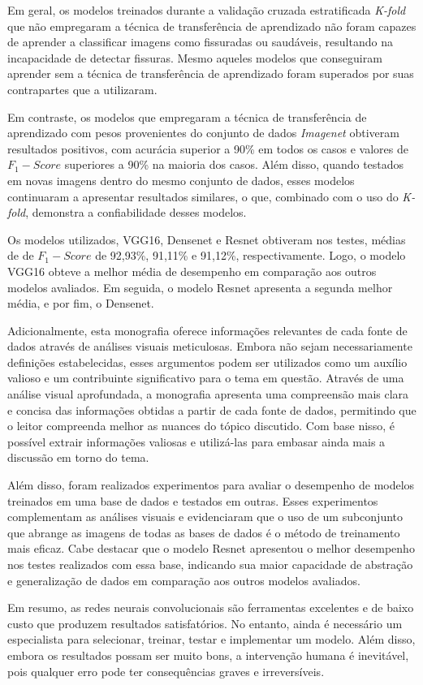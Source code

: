 
Em geral, os modelos treinados durante a validação cruzada estratificada \textit{K-fold} que não empregaram a técnica de transferência de aprendizado não foram capazes de aprender a classificar imagens como fissuradas ou saudáveis, resultando na incapacidade de detectar fissuras. 
Mesmo aqueles modelos que conseguiram aprender sem a técnica de transferência de aprendizado foram superados por suas contrapartes que a utilizaram.

Em contraste, os modelos que empregaram a técnica de transferência de aprendizado com pesos provenientes do conjunto de dados \textit{Imagenet} obtiveram resultados positivos, com acurácia superior a 90\% em todos os casos e valores de $F_{1}-Score$ superiores a 90\% na maioria dos casos.
Além disso, quando testados em novas imagens dentro do mesmo conjunto de dados, esses modelos continuaram a apresentar resultados similares, o que, combinado com o uso do \textit{K-fold}, demonstra a confiabilidade desses modelos.

Os modelos utilizados, VGG16, Densenet e Resnet obtiveram nos testes, médias de de $F_{1}-Score$ de 92,93\%, 91,11\% e 91,12\%, respectivamente.
Logo, o modelo VGG16 obteve a melhor média de desempenho em comparação aos outros modelos avaliados.
Em seguida, o modelo Resnet apresenta a segunda melhor média, e por fim, o Densenet.

Adicionalmente, esta monografia oferece informações relevantes de cada fonte de dados através de análises visuais meticulosas. 
Embora não sejam necessariamente definições estabelecidas, esses argumentos podem ser utilizados como um auxílio valioso e um contribuinte significativo para o tema em questão. 
Através de uma análise visual aprofundada, a monografia apresenta uma compreensão mais clara e concisa das informações obtidas a partir de cada fonte de dados, permitindo que o leitor compreenda melhor as nuances do tópico discutido.
Com base nisso, é possível extrair informações valiosas e utilizá-las para embasar ainda mais a discussão em torno do tema.

Além disso, foram realizados experimentos para avaliar o desempenho de modelos treinados em uma base de dados e testados em outras. 
Esses experimentos complementam  as análises visuais e evidenciaram que o uso de um subconjunto que abrange as imagens de todas as bases de dados é o método de treinamento mais eficaz. 
Cabe destacar que o modelo Resnet apresentou o melhor desempenho nos testes realizados com essa base, indicando sua maior capacidade de abstração e generalização de dados em comparação aos outros modelos avaliados.

Em resumo, as redes neurais convolucionais são ferramentas excelentes e de baixo custo que produzem resultados satisfatórios. 
No entanto, ainda é necessário um especialista para selecionar, treinar, testar e implementar um modelo. 
Além disso, embora os resultados possam ser muito bons, a intervenção humana é inevitável, pois qualquer erro pode ter consequências graves e irreversíveis. 
